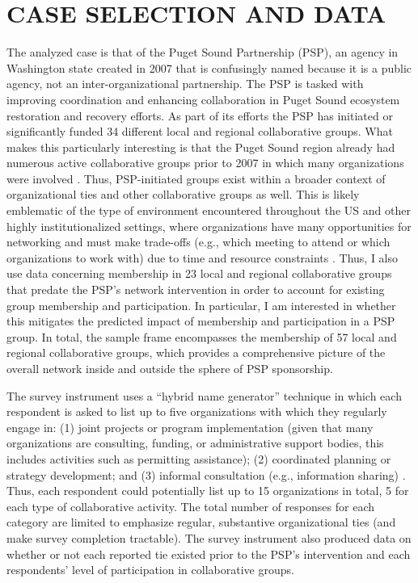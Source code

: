 \documentclass[12pt,a4paper,titlepage]{article}
\begin{document}
\section{\bf\MakeUppercase{Case Selection and Data}}

The analyzed case is that of the Puget Sound Partnership (PSP), an agency in Washington state created in 2007 that is confusingly named because it is a public agency, not an inter-organizational partnership. The PSP is tasked with improving coordination and enhancing collaboration in Puget Sound ecosystem restoration and recovery efforts. As part of its efforts the PSP has initiated or significantly funded 34 different local and regional collaborative groups. What makes this particularly interesting is that the Puget Sound region already had numerous active collaborative groups prior to 2007 in which many organizations were involved \parencite[see][]{scott2015-a}. Thus, PSP-initiated groups exist within a broader context of organizational ties and other collaborative groups as well. This is likely emblematic of the type of environment encountered throughout the US and other highly institutionalized settings, where organizations have many opportunities for networking and must make trade-offs (e.g., which meeting to attend or which organizations to work with) due to time and resource constraints \parencite{lubell2010}. Thus, I also use data concerning membership in 23 local and regional collaborative groups that predate the PSP’s network intervention in order to account for existing group membership and participation. In particular, I am interested in whether this mitigates the predicted impact of membership and participation in a PSP group. In total, the sample frame encompasses the membership of 57 local and regional collaborative groups, which provides a comprehensive picture of the overall network inside and outside the sphere of PSP sponsorship.

The survey instrument uses a “hybrid name generator” technique \parencite{henry2012,lubell2011-a} in which each respondent is asked to list up to five organizations with which they regularly engage in: (1) joint projects or program implementation (given that many organizations are consulting, funding, or administrative support bodies, this includes activities such as permitting assistance); (2) coordinated planning or strategy development; and (3) informal consultation (e.g., information sharing) \parencite{scott2015-a}. Thus, each respondent could potentially list up to 15 organizations in total, 5 for each type of collaborative activity. The total number of responses for each category are limited to emphasize regular, substantive organizational ties (and make survey completion tractable). The survey instrument also produced data on whether or not each reported tie existed prior to the PSP’s intervention and each respondents’ level of participation in collaborative groups.
\end{document}
